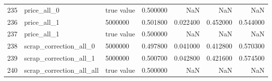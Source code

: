 \begin{tabular}{lllrrrr}
235 & price_all_0 & true value & 0.500000 & NaN & NaN & NaN \\
236 & price_all_1 & 5000000 & 0.501800 & 0.022400 & 0.452000 & 0.544000 \\
237 & price_all_1 & true value & 0.500000 & NaN & NaN & NaN \\
238 & scrap_correction_all_0 & 5000000 & 0.497800 & 0.041000 & 0.412800 & 0.570300 \\
239 & scrap_correction_all_1 & 5000000 & 0.500700 & 0.042800 & 0.421600 & 0.574500 \\
240 & scrap_correction_all_all & true value & 0.500000 & NaN & NaN & NaN \\
\bottomrule
\end{tabular}
